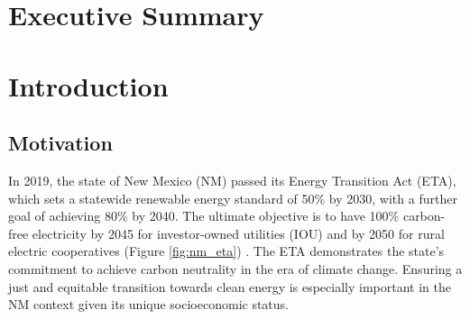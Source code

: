\documentclass[12pt,twoside,letterpaper]{article}
\begin{document}
\onehalfspacing


\section*{Executive Summary}

\newpage





\tableofcontents

\newpage
\section[Introduction]{Introduction}

\subsection[Motivation]{Motivation}


In 2019, the state of New Mexico (NM) passed its Energy Transition Act (ETA), which sets a statewide renewable energy standard of 50\% by 2030, with a further goal of achieving 80\% by 2040. The ultimate objective is to have 100\% carbon-free electricity by 2045 for investor-owned utilities (IOU) and by 2050 for rural electric cooperatives (Figure \ref{fig:nm_eta}) \parencite{nmleg2019}. The ETA demonstrates the state's commitment to achieve carbon neutrality in the era of climate change. Ensuring a just and equitable transition towards clean energy is especially important in the NM context given its unique socioeconomic status.
\end{document}
